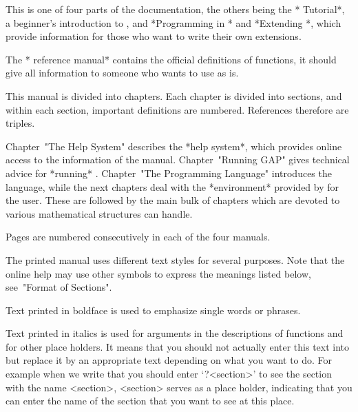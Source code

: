 %
%
%
%

This is one of four parts of the {\GAP} documentation,
the others being the *{\GAP} Tutorial*, a beginner's introduction to {\GAP},
and *Programming in {\GAP}* and *Extending {\GAP}*,
which provide information for those who want to write their own
{\GAP} extensions.

The *{\GAP} reference manual* contains the official definitions of {\GAP}
functions, it should give all information to someone who wants to use
{\GAP} as is.

This manual is divided into chapters.
Each chapter is divided into sections,
and within each section, important definitions are numbered.
References therefore are triples.

Chapter~"The Help System" describes the *help system*,
which provides online access to the information of the manual.
Chapter~"Running GAP" gives technical advice for *running* {\GAP}.
Chapter~"The Programming Language" introduces the {\GAP} language,
while the next chapters deal with the *environment*
provided by {\GAP} for the user.
These are followed by the main bulk of chapters
which are devoted to various mathematical structures {\GAP} can handle.

Pages are numbered consecutively in each of the four manuals.


The printed manual uses different text styles for several purposes.
Note that the online help may use other symbols to express the meanings
listed below, see~"Format of Sections".


Text printed in boldface is used to emphasize single words or phrases.


Text printed in italics is used for arguments in the descriptions
of functions and for other place holders. It means that you should not
actually enter this text into {\GAP} but replace it by an appropriate
text depending on what you want to do. For example when we write that
you should enter `?<section>' to see the section with the name <section>,
<section> serves as a place holder, indicating that you can enter the
name of the section that you want to see at this place.

